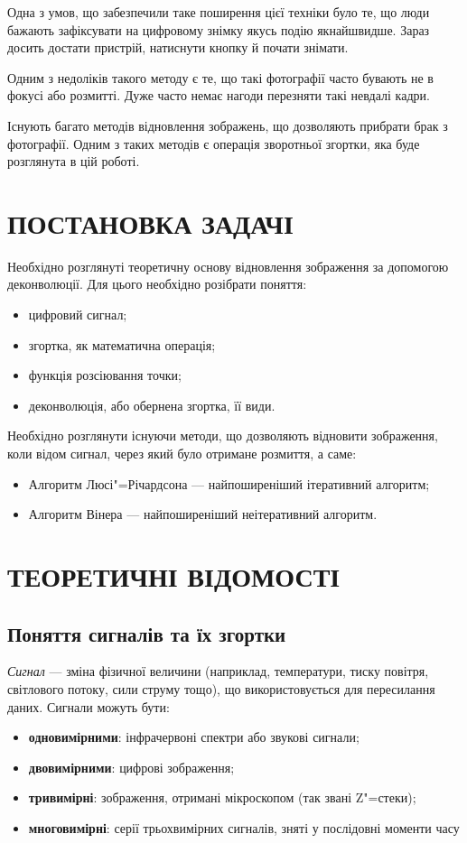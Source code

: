 \documentclass[simple,14pt,utf8,ukrainian]{eskdtext}
\begin{document}
  Одна з умов, що забезпечили таке поширення цієї техніки було те, що люди
  бажають зафіксувати на цифровому знімку якусь подію якнайшвидше.
  Зараз досить достати пристрій, натиснути кнопку й почати знімати.

  Одним з недоліків такого методу є те, що такі фотографії часто бувають
  не в фокусі або розмитті.
  Дуже часто немає нагоди перезняти такі невдалі кадри.

  Існують багато методів відновлення зображень, що дозволяють прибрати брак з
  фотографії.
  Одним з таких методів є операція зворотньої згортки, яка буде розглянута в
  цій роботі.
  \clearpage

\section{ПОСТАНОВКА ЗАДАЧІ}
  Необхідно розглянуті теоретичну основу відновлення зображення за допомогою
  деконволюції.
  Для цього необхідно розібрати поняття:
  \begin{itemize}
    \item цифровий сигнал;
    \item згортка, як математична операція;
    \item функція розсіювання точки;
    \item деконволюція, або обернена згортка, її види.
  \end{itemize}

  Необхідно розглянути існуючи методи, що дозволяють відновити зображення,
  коли відом сигнал, через який було отримане розмиття, а саме:
  \begin{itemize}
    \item Алгоритм Люсі"=Річардсона --- найпоширеніший ітеративний алгоритм;
    \item Алгоритм Вінера --- найпоширеніший неітеративний алгоритм.
  \end{itemize}
  \clearpage

\section{ТЕОРЕТИЧНІ ВІДОМОСТІ}
\subsection{Поняття сигналів та їх згортки}
  \emph{Сигнал} --- зміна фізичної величини (наприклад, температури, тиску
  повітря, світлового потоку, сили струму тощо), що використовується для
  пересилання даних.
  Сигнали можуть бути:
  \begin{itemize}
    \item \textbf{одновимірними}: інфрачервоні спектри або звукові сигнали;
    \item \textbf{двовимірними}: цифрові зображення;
    \item \textbf{тривимірні}: зображення, отримані мікроскопом (так звані
      Z"=стеки);
    \item \textbf{многовимірні}: серії трьохвимірних сигналів, зняті у
      послідовні моменти часу
  \end{itemize}
\end{document}
